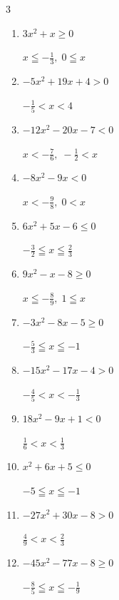 \begin{multicols}{3}
\begin{enumerate}
        $\displaystyle x < -1 , \; \frac{5}{9} < x$

  \item $3x^{2}+x\geq 0$

        $\displaystyle x \leqq -\frac{1}{3} , \; 0 \leqq x$

  \item $-5x^{2}+19x+4>0$

        $\displaystyle -\frac{1}{5} < x < 4$

  \item $-12x^{2}-20x-7<0$

        $\displaystyle x < -\frac{7}{6} , \; -\frac{1}{2} < x$

  \item $-8x^{2}-9x<0$

        $\displaystyle x < -\frac{9}{8} , \; 0 < x$

  \item $6x^{2}+5x-6\leq 0$

        $\displaystyle -\frac{3}{2} \leqq x \leqq \frac{2}{3}$

  \item $9x^{2}-x-8\geq 0$

        $\displaystyle x \leqq -\frac{8}{9} , \; 1 \leqq x$

  \item $-3x^{2}-8x-5\geq 0$

        $\displaystyle -\frac{5}{3} \leqq x \leqq -1$

\columnbreak %

\resetques

  \item $-15x^{2}-17x-4>0$

        $\displaystyle -\frac{4}{5} < x < -\frac{1}{3}$

  \item $18x^{2}-9x+1<0$

        $\displaystyle \frac{1}{6} < x < \frac{1}{3}$

  \item $x^{2}+6x+5\leq 0$

        $\displaystyle -5 \leqq x \leqq -1$

  \item $-27x^{2}+30x-8>0$

        $\displaystyle \frac{4}{9} < x < \frac{2}{3}$

  \item $-45x^{2}-77x-8\geq 0$

        $\displaystyle -\frac{8}{5} \leqq x \leqq -\frac{1}{9}$


\end{enumerate}
\end{multicols}
